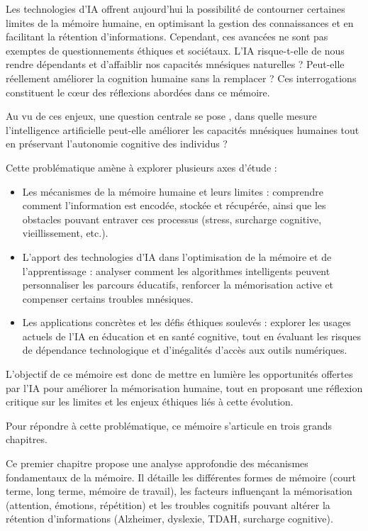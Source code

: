 \documentclass[12pt,a4paper]{report}
\begin{document}
Les technologies d’IA offrent aujourd’hui la possibilité de contourner certaines limites de la mémoire humaine, en optimisant la gestion des connaissances et en facilitant la rétention d’informations. Cependant, ces avancées ne sont pas exemptes de questionnements éthiques et sociétaux. L’IA risque-t-elle de nous rendre dépendants et d’affaiblir nos capacités mnésiques naturelles ? Peut-elle réellement améliorer la cognition humaine sans la remplacer ? Ces interrogations constituent le cœur des réflexions abordées dans ce mémoire.

Au vu de ces enjeux, une question centrale se pose , dans quelle mesure l’intelligence artificielle peut-elle améliorer les capacités mnésiques humaines tout en préservant l’autonomie cognitive des individus ?

Cette problématique amène à explorer plusieurs axes d’étude :
\begin{itemize}

    \item Les mécanismes de la mémoire humaine et leurs limites : comprendre comment l’information est encodée, stockée et récupérée, ainsi que les obstacles pouvant entraver ces processus (stress, surcharge cognitive, vieillissement, etc.).

    \item L’apport des technologies d’IA dans l’optimisation de la mémoire et de l’apprentissage : analyser comment les algorithmes intelligents peuvent personnaliser les parcours éducatifs, renforcer la mémorisation active et compenser certains troubles mnésiques.

    \item Les applications concrètes et les défis éthiques soulevés : explorer les usages actuels de l’IA en éducation et en santé cognitive, tout en évaluant les risques de dépendance technologique et d’inégalités d’accès aux outils numériques.

\end{itemize}


L’objectif de ce mémoire est donc de mettre en lumière les opportunités offertes par l’IA pour améliorer la mémorisation humaine, tout en proposant une réflexion critique sur les limites et les enjeux éthiques liés à cette évolution.

Pour répondre à cette problématique, ce mémoire s’articule en trois grands chapitres.

Ce premier chapitre propose une analyse approfondie des mécanismes fondamentaux de la mémoire. Il détaille les différentes formes de mémoire (court terme, long terme, mémoire de travail), les facteurs influençant la mémorisation (attention, émotions, répétition) et les troubles cognitifs pouvant altérer la rétention d’informations (Alzheimer, dyslexie, TDAH, surcharge cognitive).
\end{document}
